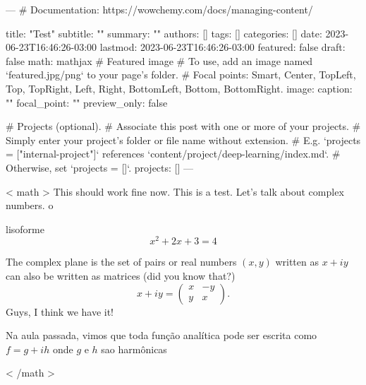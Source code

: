 ---
# Documentation: https://wowchemy.com/docs/managing-content/

title: "Test"
subtitle: ""
summary: ""
authors: []
tags: []
categories: []
date: 2023-06-23T16:46:26-03:00
lastmod: 2023-06-23T16:46:26-03:00
featured: false
draft: false
math: mathjax
# Featured image
# To use, add an image named `featured.jpg/png` to your page's folder.
# Focal points: Smart, Center, TopLeft, Top, TopRight, Left, Right, BottomLeft, Bottom, BottomRight.
image:
  caption: ""
  focal_point: ""
  preview_only: false

# Projects (optional).
#   Associate this post with one or more of your projects.
#   Simply enter your project's folder or file name without extension.
#   E.g. `projects = ["internal-project"]` references `content/project/deep-learning/index.md`.
#   Otherwise, set `projects = []`.
projects: []
---

{{< math >}}
This should work fine now.
This is a test. Let's talk about complex numbers.
o

lisoforme
\begin{equation}
x^2+2x+3=4
\end{equation}


The complex plane is the set of pairs or real numbers $(x,y)$ written as $x+iy$
can also be written as matrices (did you know that?)
$$
x+iy=\begin{pmatrix}
x & -y\\ y&x
\end{pmatrix}.
$$
Guys, I think we have it!


Na aula passada, vimos que toda função analítica pode ser escrita como
$f=g+ih$ onde $g$ e $h$ sao harmônicas


{{< /math >}}
